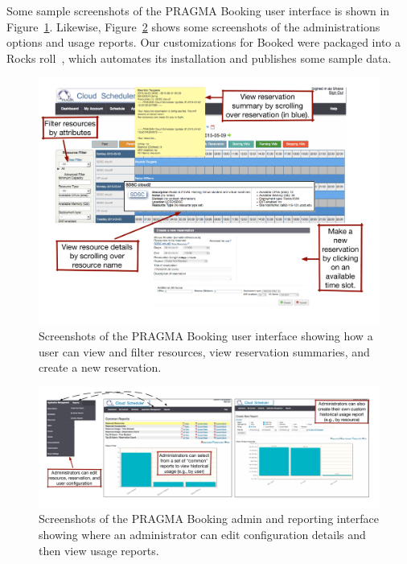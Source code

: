 \documentclass{acm_proc_article-sp}
\begin{document}
Some sample screenshots of the PRAGMA Booking user interface is shown in Figure~\ref{Fig:Booked}.  Likewise, Figure~\ref{Fig:Reports} shows some screenshots of the administrations options and usage reports.  Our customizations for Booked were packaged into a Rocks roll~\cite{cloudscheduler}, which automates its installation and publishes some sample data.

\begin{figure}[htbp]
\begin{center}
\includegraphics[width=\textwidth]{figures/bookedReservationScreenshot.pdf}
\caption{Screenshots of the PRAGMA Booking user interface showing how a user can view and filter resources, view reservation summaries, and create a new reservation.}
\label{Fig:Booked}
\end{center}
\end{figure}

\begin{figure}[htbp]
\begin{center}
\includegraphics[width=\textwidth]{figures/bookedReportScreenshot.pdf}
\caption{Screenshots of the PRAGMA Booking admin and reporting interface showing where an administrator can edit configuration details and then view usage reports.}
\label{Fig:Reports}
\end{center}
\end{figure}
\end{document}
